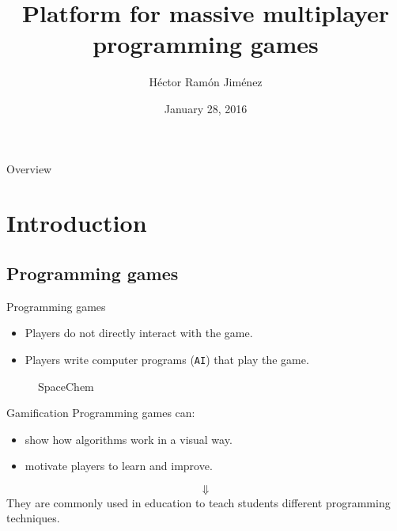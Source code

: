 \documentclass{beamer}
\title{Platform for massive multiplayer\\ programming games}
\institute{Facultat d'Informàtica de Barcelona}
\author{Héctor Ramón Jiménez}
\date{January 28, 2016}
\begin{document}
\frame{\titlepage}
\begin{frame}{Overview}
\tableofcontents
\end{frame}
\section{Introduction}
\subsection{Programming games}
\begin{frame}{Programming games}
\begin{itemize}
\item
Players do not directly interact with the game.
\item
Players write computer programs (\texttt{AI}) that play the game.
\end{itemize}
\begin{figure}[H]
\begin{center}
\noindent{}
\end{center}
\caption{SpaceChem}
\end{figure}
\end{frame}
\begin{frame}{Gamification}
Programming games can:
\begin{itemize}
\item
show how algorithms work in a visual way.
\item
motivate players to learn and improve.
\end{itemize}
\pause
\begin{center}
$$\Downarrow$$
      They are commonly used in education to teach students different programming techniques.
\end{center}
\end{frame}
\end{document}
